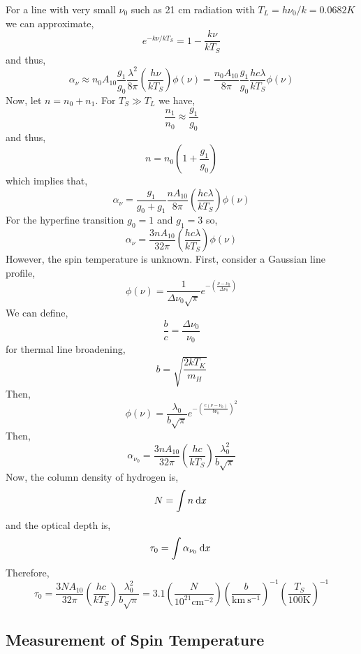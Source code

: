 \documentclass[11pt, a4paper]{article}
\begin{document}
For a line with very small $\nu_0$ such as 21 cm radiation with $T_L = h \nu_0 / k = 0.0682 K$ we can approximate,
\[ e^{-k \nu / kT_S} = 1 - \frac{k \nu}{k T_S} \]
and thus,
\[ \alpha_\nu \approx n_0 A_{10} \frac{g_1}{g_0} \frac{\lambda^2}{8 \pi} \left( \frac{h \nu}{k T_S} \right) \phi(\nu) = \frac{n_0 A_{10}}{8 \pi} \frac{g_1}{g_0} \frac{h c \lambda}{k T_S} \phi(\nu) 
\]
Now, let $n = n_0 + n_1$. For $T_S \gg T_L$ we have,
\[ \frac{n_1}{n_0} \approx \frac{g_1}{g_0} \]
and thus,
\[ n = n_0 \left( 1 + \frac{g_1}{g_0} \right) \]
which implies that,
\[ \alpha_\nu = \frac{g_1}{g_0 + g_1} \frac{n A_{10}}{8 \pi} \left( \frac{h c \lambda}{k T_S} \right) \phi(\nu) \]
For the hyperfine transition $g_0 = 1$ and $g_1 = 3$ so,
\[ \alpha_\nu = \frac{3 n A_{10}}{32 \pi} \left( \frac{h c \lambda}{k T_S} \right) \phi(\nu) \]
However, the spin temperature is unknown. First, consider a Gaussian line profile,
\[ \phi(\nu) = \frac{1}{\Delta \nu_0 \sqrt{\pi}} e^{- \left( \frac{ \nu - \nu_0 }{\Delta \nu_0} \right)} \]
We can define,
\[ \frac{b}{c} = \frac{\Delta \nu_0}{\nu_0} \]
for thermal line broadening,
\[ b = \sqrt{ \frac{2 k T_K}{m_H}} \]
Then,
\[ \phi(\nu) = \frac{\lambda_0}{b \sqrt{\pi}} e^{- \left( \frac{c(\nu - \nu_0)}{b \nu_0} \right)^2} \]
Then,
\[ \alpha_{\nu_0} = \frac{3 n A_{10}}{32 \pi} \left( \frac{h c}{k T_S} \right) \frac{\lambda_0^2}{b \sqrt{\pi}} \]  
Now, the column density of hydrogen is,
\[ N = \int n \: \mathrm{d}x \: \]
and the optical depth is,
\[ \tau_0 = \int \alpha_{\nu_0} \: \mathrm{d}x \: \]
Therefore,
\[ \tau_0 = \frac{3 N A_{10}}{32 \pi} \left( \frac{h c}{k T_S} \right) \frac{\lambda_0^2}{b \sqrt{\pi}} = 3.1 \left( \frac{N}{10^{21} \text{cm}^{-2}} \right) \left( \frac{b}{\text{km} \: \text{s}^{-1}}\right)^{-1} \left( \frac{T_S}{100 \text{K}} \right)^{-1} \]

\subsection{Measurement of Spin Temperature}
\end{document}
